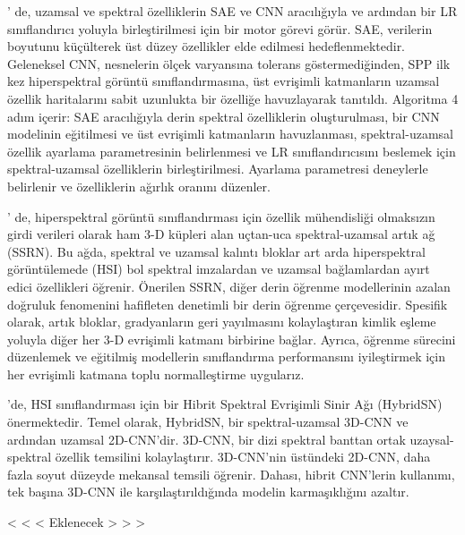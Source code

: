 \citep{yue2016deep}' de, uzamsal ve spektral özelliklerin SAE ve CNN aracılığıyla ve ardından bir LR sınıflandırıcı yoluyla birleştirilmesi için bir motor görevi görür. SAE, verilerin boyutunu küçülterek üst düzey özellikler elde edilmesi hedeflenmektedir. Geleneksel CNN, nesnelerin ölçek varyansına tolerans göstermediğinden, SPP ilk kez hiperspektral görüntü sınıflandırmasına, üst evrişimli katmanların uzamsal özellik haritalarını sabit uzunlukta bir özelliğe havuzlayarak tanıtıldı. Algoritma 4 adım içerir: SAE aracılığıyla derin spektral özelliklerin oluşturulması, bir CNN modelinin eğitilmesi ve üst evrişimli katmanların havuzlanması, spektral-uzamsal özellik ayarlama parametresinin belirlenmesi ve LR sınıflandırıcısını beslemek için spektral-uzamsal özelliklerin birleştirilmesi. Ayarlama parametresi deneylerle belirlenir ve özelliklerin ağırlık oranını düzenler.

\citep{zhong2017spectral}' de, hiperspektral görüntü sınıflandırması için özellik mühendisliği olmaksızın girdi verileri olarak ham 3-D küpleri alan uçtan-uca spektral-uzamsal artık ağ (SSRN). Bu ağda, spektral ve uzamsal kalıntı bloklar art arda hiperspektral görüntülemede (HSI) bol spektral imzalardan ve uzamsal bağlamlardan ayırt edici özellikleri öğrenir. Önerilen SSRN, diğer derin öğrenme modellerinin azalan doğruluk fenomenini hafifleten denetimli bir derin öğrenme çerçevesidir. Spesifik olarak, artık bloklar, gradyanların geri yayılmasını kolaylaştıran kimlik eşleme yoluyla diğer her 3-D evrişimli katmanı birbirine bağlar. Ayrıca, öğrenme sürecini düzenlemek ve eğitilmiş modellerin sınıflandırma performansını iyileştirmek için her evrişimli katmana toplu normalleştirme uygularız.

\citep{roy2019hybridsn} 'de, HSI sınıflandırması için bir Hibrit Spektral Evrişimli Sinir Ağı (HybridSN) önermektedir. Temel olarak, HybridSN, bir spektral-uzamsal 3D-CNN ve ardından uzamsal 2D-CNN'dir. 3D-CNN, bir dizi spektral banttan ortak uzaysal-spektral özellik temsilini kolaylaştırır. 3D-CNN'nin üstündeki 2D-CNN, daha fazla soyut düzeyde mekansal temsili öğrenir. Dahası, hibrit CNN'lerin kullanımı, tek başına 3D-CNN ile karşılaştırıldığında modelin karmaşıklığını azaltır.

\citep{bai2019ssdc} < < <  Eklenecek > > >

